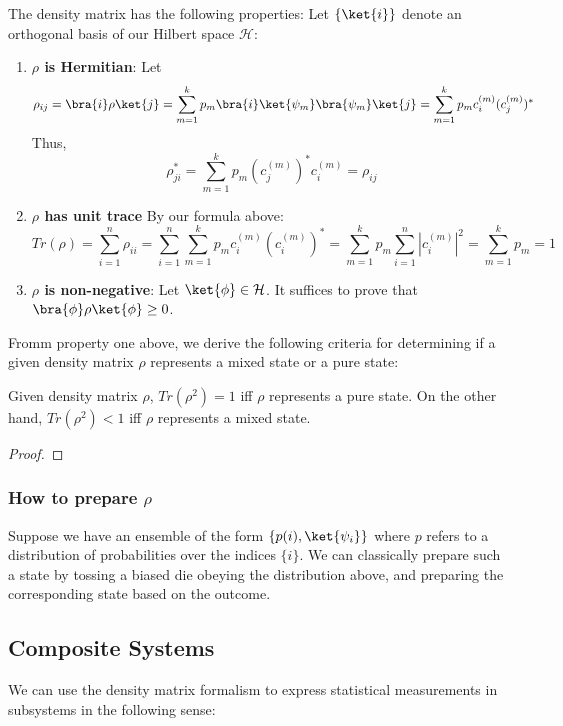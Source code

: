 The density matrix has the following properties: Let $\{\ket{i}\}$ denote an orthogonal basis of our Hilbert space $\mathcal{H}$:

\begin{enumerate}
  \item {\bf $\rho$ is Hermitian}: Let
  $$ \rho_{ij} = \bra{i}\rho\ket{j} = \sum_{m=1}^k p_m \bra{i}\ket{\psi_m} \bra{\psi_m}\ket{j} = \sum_{m=1}^k p_m c_i^{(m)} (c_j^{(m)})^*$$ Thus,
  $$ \rho_{ji}^* = \sum_{m=1}^k p_m (c_j^{(m)})^* c_i^{(m)} = \rho_{ij}  $$
  \item {\bf $\rho$ has unit trace} By our formula above:
  $$ Tr(\rho) = \sum_{i=1}^n \rho_{ii} = \sum_{i=1}^n\sum_{m=1}^k p_m c_{i}^{(m)}(c_{i}^{(m)})^* = \sum_{m=1}^k p_m \sum_{i=1}^n|c_i^{(m)}|^2 =
  \sum_{m=1}^k p_m = 1
  $$
  \item {\bf $\rho$ is non-negative}: Let $\ket{\phi} \in \mathcal{H}$. It suffices to prove that $\bra{\phi}\rho\ket{\phi} \geq 0$.
\end{enumerate}

Fromm property one above, we derive the following criteria for determining if a given density matrix $\rho$ represents a mixed state or a pure state:

\begin{theorem}
  Given density matrix $\rho$, $Tr(\rho^2) = 1$ iff $\rho$ represents a pure state. On the other hand, $Tr(\rho^2) < 1$ iff $\rho$ represents a mixed state.
\end{theorem}

\begin{proof}

\end{proof}

\subsubsection{How to prepare $\rho$}
Suppose we have an ensemble of the form $\{p(i),\ket{\psi_i}\}$ where $p$ refers to a distribution of probabilities over the indices $\{i\}$. We can classically prepare such a state by tossing a biased die obeying the distribution above, and preparing the corresponding state based on the outcome.

\subsection{Composite Systems}

We can use the density matrix formalism to express statistical measurements in subsystems in the following sense:

